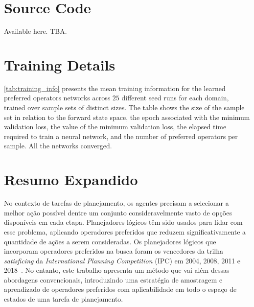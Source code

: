 \documentclass[ppgc,diss,english]{iiufrgs}
\begin{document}



\appendix


\chapter{Source Code}
Available here. TBA.

\chapter{Training Details}
\cref{tab:training_info} presents the mean training information for the learned preferred operators \pog networks across $25$ different seed runs for each domain, trained over sample sets of distinct sizes. The table shows the size of the sample set in relation to the forward state space, the epoch associated with the minimum validation loss, the value of the minimum validation loss, the elapsed time required to train a neural network, and the number of preferred operators per sample. All the networks converged.



\chapter{Resumo Expandido}
\noindent

No contexto de tarefas de planejamento, os agentes precisam a selecionar a melhor ação possível dentre um conjunto consideravelmente vasto de opções disponíveis em cada etapa. Planejadores lógicos têm sido usados para lidar com esse problema, aplicando operadores preferidos que reduzem significativamente a quantidade de ações a serem consideradas. Os planejadores lógicos que incorporam operadores preferidos na busca foram os vencedores da trilha \emph{satisficing} da \emph{International Planning Competition} (IPC) em 2004, 2008, 2011 e 2018~\cite{Helmert/2006,Richter.lama.etal/2011,Richter.lama.etal/2011,Seipp-fast.etal/2018}.
No entanto, este trabalho apresenta um método que vai além dessas abordagens convencionais, introduzindo uma estratégia de amostragem e aprendizado de operadores preferidos com aplicabilidade em todo o espaço de estados de uma tarefa de planejamento.
\end{document}
